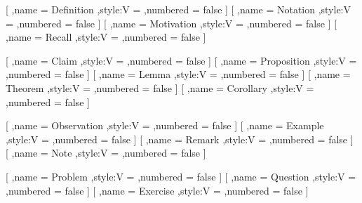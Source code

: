 {%
        [
            ,name = Definition
            ,style:V = \greenbox
            ,numbered = false
        ]
        [
            ,name = Notation
            ,style:V = \greenbox
            ,numbered = false
        ]
        [
            ,name = Motivation
            ,style:V = \greenbox
            ,numbered = false
        ]
        [
            ,name = Recall
            ,style:V = \greenbox
            ,numbered = false
        ]

        [
            ,name = Claim
            ,style:V = \redbox
            ,numbered = false
        ]
        [
            ,name = Proposition
            ,style:V = \redbox
            ,numbered = false
        ]
        [
            ,name = Lemma
            ,style:V = \redbox
            ,numbered = false
        ]
        [
            ,name = Theorem
            ,style:V = \redbox
            ,numbered = false
        ]
        [
            ,name = Corollary
            ,style:V = \redbox
            ,numbered = false
        ]

        [
            ,name = Observation
            ,style:V = \bluebox
            ,numbered = false
        ]
        [
            ,name = Example
            ,style:V = \bluebox
            ,numbered = false
        ]
        [
            ,name = Remark
            ,style:V = \bluebox
            ,numbered = false
        ]
        [
            ,name = Note
            ,style:V = \bluebox
            ,numbered = false
        ]

        [
            ,name = Problem
            ,style:V = \purplebox
            ,numbered = false
        ]
        [
            ,name = Question
            ,style:V = \purplebox
            ,numbered = false
        ]
        [
            ,name = Exercise
            ,style:V = \purplebox
            ,numbered = false
        ]

}
